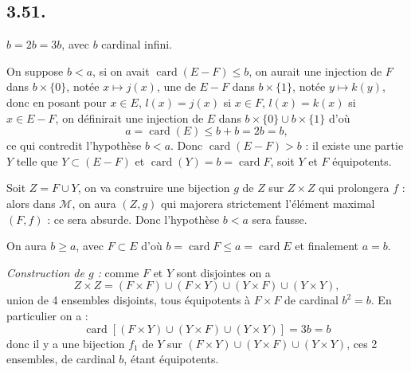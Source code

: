 \subsection*{3.51.}
$b=2b=3b$, avec $b$ cardinal infini.

On suppose $b<a$, si on avait $\operatorname{card}(E-F)\le b$, on aurait une injection de $F$ dans $b\times\{0\}$, notée $x\mapsto j(x)$, une de $E-F$ dans $b\times\{1\}$, notée $y\mapsto k(y)$, donc en posant pour $x\in E$, $l(x)=j(x)$ si $x\in F$, $l(x)=k(x)$ si $x\in E-F$, on définirait une injection de $E$ dans $b\times\{0\}\cup b\times\{1\}$ d'où
\[
a=\operatorname{card}(E)\le b+b=2b=b,
\]
ce qui contredit l'hypothèse $b<a$. Donc $\operatorname{card}(E-F)>b$ : il existe une partie $Y$ telle que $Y\subset(E-F)$ et $\operatorname{card}(Y)=b=\operatorname{card}F$, soit $Y$ et $F$ équipotents.

Soit $Z=F\cup Y$, on va construire une bijection $g$ de $Z$ sur $Z\times Z$ qui prolongera $f$ : alors dans $\mathcal M$, on aura $(Z,g)$ qui majorera strictement l'élément maximal $(F,f)$ : ce sera absurde. Donc l'hypothèse $b<a$ sera fausse.

On aura $b\ge a$, avec $F\subset E$ d'où $b=\operatorname{card}F\le a=\operatorname{card}E$ et finalement $a=b$.

\emph{Construction de $g$ :} comme $F$ et $Y$ sont disjointes on a
\[
Z\times Z=(F\times F)\cup(F\times Y)\cup(Y\times F)\cup(Y\times Y),
\]
union de 4 ensembles disjoints, tous équipotents à $F\times F$ de cardinal $b^2=b$. En particulier on a :
\[
\operatorname{card}[(F\times Y)\cup(Y\times F)\cup(Y\times Y)]=3b=b
\]
donc il y a une bijection $f_1$ de $Y$ sur $(F\times Y)\cup(Y\times F)\cup(Y\times Y)$, ces 2 ensembles, de cardinal $b$, étant équipotents.

 \bookend

